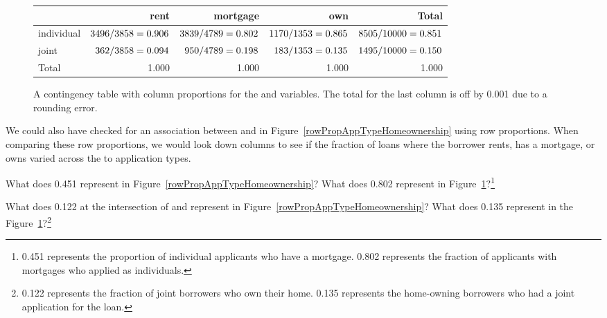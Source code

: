 \begin{figure}[h]
\centering\small
\begin{tabular}{l rrr r}
  \hline
  & rent & mortgage & own & Total \\
  \hline
  individual &
      $3496{}/3858{} = 0.906$ &
      $3839{}/4789{} = 0.802$ &
      $1170{}/1353{} = 0.865$ &
      $8505{}/10000{} = 0.851$ \\
  joint &
      $362{}/3858{} = 0.094$ &
      $950{}/4789{} = 0.198$ &
      $183{}/1353{} = 0.135$ &
      $1495{}/10000{} = 0.150$ \\
  \hline
  Total & 1.000 & 1.000 & 1.000 & 1.000 \\
  \hline
\end{tabular}
\caption{A contingency table with column proportions for the
     and 
    variables.
    The total for the last column is off by 0.001 due
    to a rounding error.}
\label{colPropAppTypeHomeownership}
\end{figure}

We could also have checked for an association between  and  in Figure~\ref{rowPropAppTypeHomeownership} using row proportions. When comparing these row proportions, we would look down columns to see if the fraction of loans where the borrower rents, has a mortgage, or owns varied across the  to  application types.


\begin{exercise}
What does 0.451 represent in Figure~\ref{rowPropAppTypeHomeownership}? What does 0.802 represent in Figure~\ref{colPropAppTypeHomeownership}?\footnote{0.451 represents the proportion of individual applicants who have a mortgage. 0.802 represents the fraction of applicants with mortgages who applied as individuals.}
\end{exercise}

\begin{exercise}
What does 0.122 at the intersection of  and  represent in Figure~\ref{rowPropAppTypeHomeownership}? What does 0.135 represent in the Figure~\ref{colPropAppTypeHomeownership}?\footnote{0.122 represents the fraction of joint borrowers who own their home. 0.135 represents the home-owning borrowers who had a joint application for the loan.}
\end{exercise}


